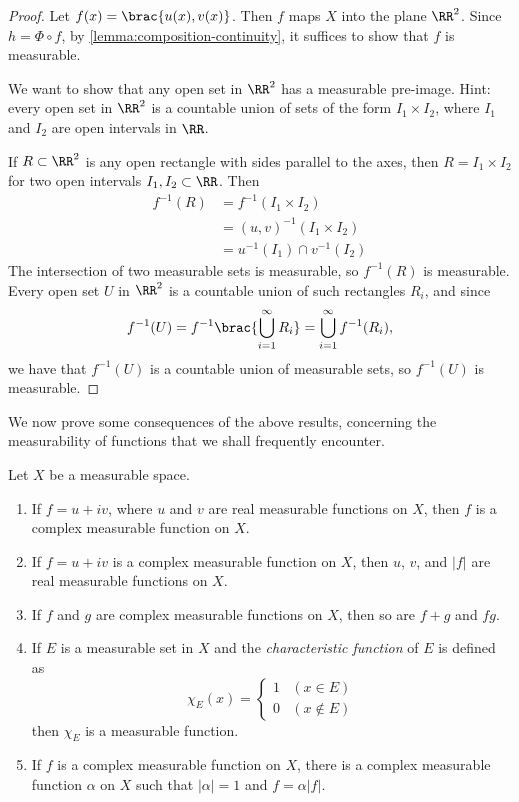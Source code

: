 \begin{proof}
Let $f(x)=\brac{u(x),v(x)}$. Then $f$ maps $X$ into the plane $\RR^2$. Since $h=\Phi\circ f$, by \ref{lemma:composition-continuity}, it suffices to show that $f$ is measurable.

\begin{idea}
We want to show that any open set in $\RR^2$ has a measurable pre-image. 
Hint: every open set in $\RR^2$ is a countable union of sets of the form $I_1\times I_2$, where $I_1$ and $I_2$ are open intervals in $\RR$.
\end{idea}

If $R\subset\RR^2$ is any open rectangle with sides parallel to the axes, then $R=I_1\times I_2$ for two open intervals $I_1,I_2\subset\RR$. Then
\begin{align*}
f^{-1}(R)
&=f^{-1}(I_1\times I_2)\\
&=(u,v)^{-1}(I_1\times I_2)\\
&=u^{-1}(I_1)\cap v^{-1}(I_2)
\end{align*}
The intersection of two measurable sets is measurable, so $f^{-1}(R)$ is measurable.
Every open set $U$ in $\RR^2$ is a countable union of such rectangles $R_i$, and since
\[f^{-1}(U)=f^{-1}\brac{\bigcup_{i=1}^{\infty}R_i}=\bigcup_{i=1}^{\infty}f^{-1}(R_i),\]
we have that $f^{-1}(U)$ is a countable union of measurable sets, so $f^{-1}(U)$ is measurable.
\end{proof}

We now prove some consequences of the above results, concerning the measurability of functions that we shall frequently encounter.

\begin{proposition}
Let $X$ be a measurable space.
\begin{enumerate}[label=(\roman*)]
\item If $f=u+iv$, where $u$ and $v$ are real measurable functions on $X$, then $f$ is a complex measurable function on $X$.

\item If $f=u+iv$ is a complex measurable function on $X$, then $u$, $v$, and $|f|$ are real measurable functions on $X$.

\item If $f$ and $g$ are complex measurable functions on $X$, then so are $f+g$ and $fg$.

\item If $E$ is a measurable set in $X$ and the \emph{characteristic function} of $E$ is defined as
\[\chi_E(x)=\begin{cases}
1&(x\in E)\\
0&(x\notin E)
\end{cases}\]
then $\chi_E$ is a measurable function.

\item If $f$ is a complex measurable function on $X$, there is a complex measurable function $\alpha$ on $X$ such that $|\alpha|=1$ and $f=\alpha|f|$. 
\end{enumerate}
\end{proposition}

